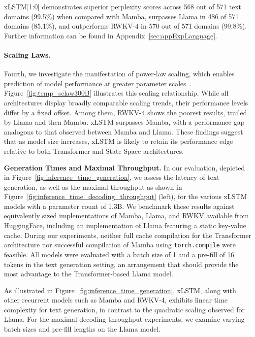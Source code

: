 xLSTM[1:0] demonstrates superior perplexity scores across 568 out of 571 text domains (99.5\%) when compared with Mamba, surpasses Llama in 486 of 571 domains (85.1\%), and outperforms RWKV-4 in 570 out of 571 domains (99.8\%). Further information can be found in Appendix~\ref{sec:appExpLanguage}.

\paragraph{Scaling Laws.} Fourth, we investigate the manifestation of power-law scaling, which enables prediction of model performance at greater parameter scales~\citep{Kaplan:20,Brown:20short}. Figure~\ref{fig:temp_sclaw300B} illustrates this scaling relationship. While all architectures display broadly comparable scaling trends, their performance levels differ by a fixed offset. Among them, RWKV-4 shows the poorest results, trailed by Llama and then Mamba. xLSTM surpasses Mamba, with a performance gap analogous to that observed between Mamba and Llama. These findings suggest that as model size increases, xLSTM is likely to retain its performance edge relative to both Transformer and State-Space architectures.

\textbf{Generation Times and Maximal Throughput.} In our evaluation, depicted in Figure~\ref{fig:inference_time_generation}, we assess the latency of text generation, as well as the maximal throughput as shown in Figure~\ref{fig:inference_time_decoding_throughput} (left), for the various xLSTM models with a parameter count of 1.3B. We benchmark these results against equivalently sized implementations of Mamba, Llama, and RWKV available from HuggingFace, including an implementation of Llama featuring a static key-value cache. During our experiments, neither full cache compilation for the Transformer architecture nor successful compilation of Mamba using \texttt{torch.compile} were feasible. All models were evaluated with a batch size of 1 and a pre-fill of 16 tokens in the text generation setting, an arrangement that should provide the most advantage to the Transformer-based Llama model.

As illustrated in Figure~\ref{fig:inference_time_generation}, xLSTM, along with other recurrent models such as Mamba and RWKV-4, exhibits linear time complexity for text generation, in contrast to the quadratic scaling observed for Llama. For the maximal decoding throughput experiments, we examine varying batch sizes and pre-fill lengths on the Llama model.

